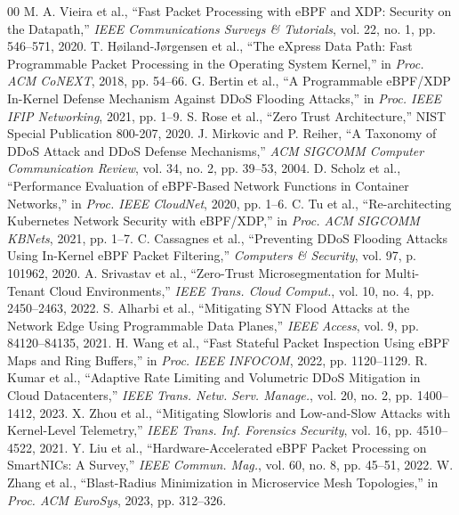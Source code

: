 \documentclass[conference]{IEEEtran}
\begin{document}
\begin{thebibliography}{00}
 M. A. Vieira et al., ``Fast Packet Processing with eBPF and XDP: Security on the Datapath,'' \emph{IEEE Communications Surveys \& Tutorials}, vol. 22, no. 1, pp. 546--571, 2020.
 T. H{\o}iland-J{\o}rgensen et al., ``The eXpress Data Path: Fast Programmable Packet Processing in the Operating System Kernel,'' in \emph{Proc. ACM CoNEXT}, 2018, pp. 54--66.
 G. Bertin et al., ``A Programmable eBPF/XDP In-Kernel Defense Mechanism Against DDoS Flooding Attacks,'' in \emph{Proc. IEEE IFIP Networking}, 2021, pp. 1--9.
 S. Rose et al., ``Zero Trust Architecture,'' NIST Special Publication 800-207, 2020.
 J. Mirkovic and P. Reiher, ``A Taxonomy of DDoS Attack and DDoS Defense Mechanisms,'' \emph{ACM SIGCOMM Computer Communication Review}, vol. 34, no. 2, pp. 39--53, 2004.
 D. Scholz et al., ``Performance Evaluation of eBPF-Based Network Functions in Container Networks,'' in \emph{Proc. IEEE CloudNet}, 2020, pp. 1--6.
 C. Tu et al., ``Re-architecting Kubernetes Network Security with eBPF/XDP,'' in \emph{Proc. ACM SIGCOMM KBNets}, 2021, pp. 1--7.
 C. Cassagnes et al., ``Preventing DDoS Flooding Attacks Using In-Kernel eBPF Packet Filtering,'' \emph{Computers \& Security}, vol. 97, p. 101962, 2020.
 A. Srivastav et al., ``Zero-Trust Microsegmentation for Multi-Tenant Cloud Environments,'' \emph{IEEE Trans. Cloud Comput.}, vol. 10, no. 4, pp. 2450--2463, 2022.
 S. Alharbi et al., ``Mitigating SYN Flood Attacks at the Network Edge Using Programmable Data Planes,'' \emph{IEEE Access}, vol. 9, pp. 84120--84135, 2021.
 H. Wang et al., ``Fast Stateful Packet Inspection Using eBPF Maps and Ring Buffers,'' in \emph{Proc. IEEE INFOCOM}, 2022, pp. 1120--1129.
 R. Kumar et al., ``Adaptive Rate Limiting and Volumetric DDoS Mitigation in Cloud Datacenters,'' \emph{IEEE Trans. Netw. Serv. Manage.}, vol. 20, no. 2, pp. 1400--1412, 2023.
 X. Zhou et al., ``Mitigating Slowloris and Low-and-Slow Attacks with Kernel-Level Telemetry,'' \emph{IEEE Trans. Inf. Forensics Security}, vol. 16, pp. 4510--4522, 2021.
 Y. Liu et al., ``Hardware-Accelerated eBPF Packet Processing on SmartNICs: A Survey,'' \emph{IEEE Commun. Mag.}, vol. 60, no. 8, pp. 45--51, 2022.
 W. Zhang et al., ``Blast-Radius Minimization in Microservice Mesh Topologies,'' in \emph{Proc. ACM EuroSys}, 2023, pp. 312--326.

\end{thebibliography}
\end{document}
